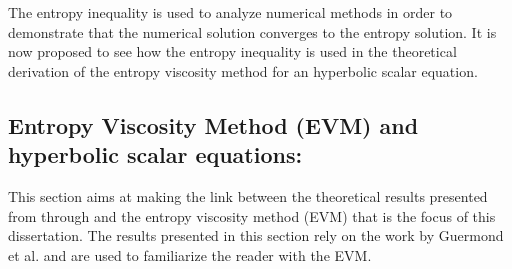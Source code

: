%
The entropy inequality is used to analyze numerical methods in order to demonstrate that the numerical solution converges to the entropy solution. It is now proposed to see how the entropy inequality is used in the theoretical derivation of the entropy viscosity method for an hyperbolic scalar equation. 

\subsection{Entropy Viscosity Method (EVM) and hyperbolic scalar equations:}\label{sec:evm_hyp_sc_sct1b}
This section aims at making the link between the theoretical results presented from  through  and the entropy viscosity method (EVM) that is the focus of this dissertation. The results presented in this section rely on the work by Guermond et al. \cite{jlg1, jlg2, jlg3, valentin} and are used to familiarize the reader with the EVM.

